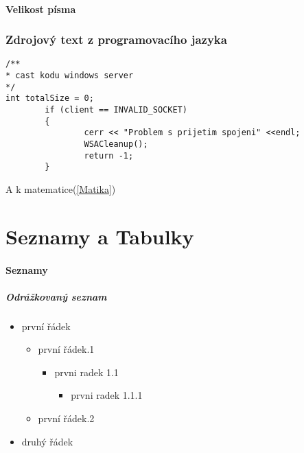 \documentclass[10pt,a4paper]{article}
\begin{document}
	\subsection{Velikost písma}
			 \cite{Skull}
\newpage
\section{Zdrojový text z programovacího jazyka}

\begin{lstlisting}
/**
* cast kodu windows server
*/
int totalSize = 0;
        if (client == INVALID_SOCKET)
        {
                cerr << "Problem s prijetim spojeni" <<endl;
                WSACleanup();
                return -1;
        }
\end{lstlisting}
A k matematice(\ref{Matika})
\newpage
\part{Seznamy a Tabulky}
\subsection{Seznamy}
	\subsubsection{Odrážkovaný seznam}
			
\begin{itemize}
\item první řádek
	\begin{itemize}
	\item první řádek.1
		\begin{itemize}
		\item prvni radek 1.1
			\begin{itemize}
			\item prvni radek 1.1.1
			\end{itemize}
		\end{itemize}		
	\item první řádek.2
	\end{itemize}
\item druhý řádek
\end{itemize}
\end{document}
